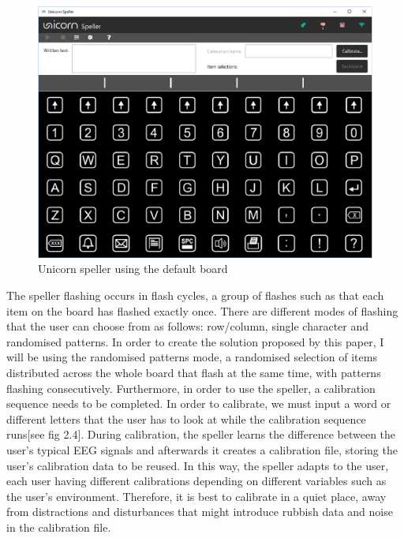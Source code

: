 \begin{figure}[H]
  \centering
  \includegraphics[width=1\textwidth]{Graphics/Speller.png}
  \caption{Unicorn speller using the default board}
\end{figure}

The speller flashing occurs in flash cycles, a group of flashes such as that each item on the board has flashed exactly once. There are different modes of flashing that the user can choose from as follows: row/column, single character and randomised patterns. In order to create the solution proposed by this paper, I will be using the randomised patterns mode, a randomised selection of items distributed across the whole board that flash at the same time, with patterns flashing consecutively\cite{UnicornSuite_Manual}. 
\vspace{\baselineskip}\newline
Furthermore, in order to use the speller, a calibration sequence needs to be completed. In order to calibrate, we must input a word or different letters that the user has to look at while the calibration sequence runs[see fig 2.4]. During calibration, the speller learns the difference between the user's typical EEG signals and afterwards it creates a calibration file, storing the user's calibration data to be reused. In this way, the speller adapts to the user, each user having different calibrations depending on different variables such as the user's environment. Therefore, it is best to calibrate in a quiet place, away from distractions and disturbances that might introduce rubbish data and noise in the calibration file.

